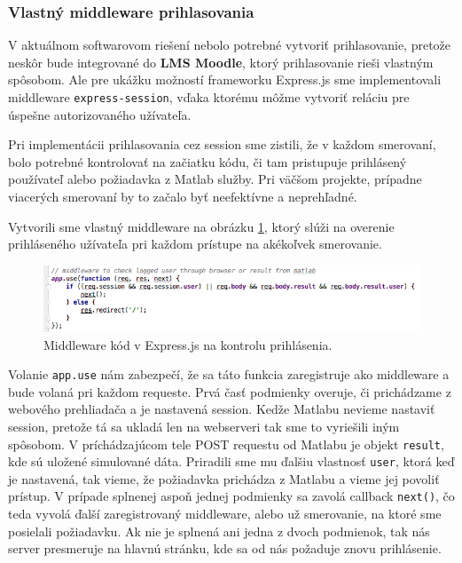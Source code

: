 \subsubsection{Vlastný middleware prihlasovania}
V aktuálnom softwarovom riešení nebolo potrebné vytvoriť prihlasovanie, pretože neskôr bude integrované do \textbf{LMS Moodle}, ktorý prihlasovanie rieši vlastným spôsobom. Ale pre ukážku možností frameworku Express.js sme implementovali middleware \verb|express-session|, vďaka ktorému môžme vytvoriť reláciu pre úspešne autorizovaného užívateľa. 

Pri implementácii prihlasovania cez session sme zistili, že v každom smerovaní, bolo potrebné kontrolovať na začiatku kódu, či tam pristupuje prihlásený používateľ alebo požiadavka z Matlab služby. Pri väčšom projekte, prípadne viacerých smerovaní by to začalo byť neefektívne a neprehľadné. 

Vytvorili sme vlastný middleware na obrázku \ref{img-code-express-middleware}, ktorý slúži na overenie prihláseného užívateľa pri každom prístupe na akékoľvek smerovanie.

\begin{figure}[H]
  \centering
  \includegraphics[scale=0.6]{img/code/express-middleware.png}
  \caption{Middleware kód v Express.js na kontrolu prihlásenia.}
  \label{img-code-express-middleware}
\end{figure}

Volanie \verb|app.use| nám zabezpečí, že sa táto funkcia zaregistruje ako middleware a bude volaná pri každom requeste. Prvá časť podmienky overuje, či prichádzame z webového prehliadača a je nastavená session. Kedže Matlabu nevieme nastaviť session, pretože tá sa ukladá len na webserveri tak sme to vyriešili iným spôsobom. V príchádzajúcom tele POST requestu od Matlabu je objekt \verb|result|, kde sú uložené simulované dáta. Priradili sme mu ďalšiu vlastnosť \verb|user|, ktorá keď je nastavená, tak vieme, že požiadavka prichádza z Matlabu a vieme jej povoliť prístup. V prípade splnenej aspoň jednej podmienky sa zavolá callback \verb|next()|, čo teda vyvolá ďalší zaregistrovaný middleware, alebo už smerovanie, na ktoré sme posielali požiadavku.
Ak nie je splnená ani jedna z dvoch podmienok, tak nás server presmeruje na hlavnú stránku, kde sa od nás požaduje znovu prihlásenie.


